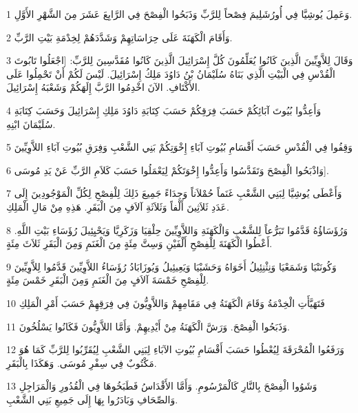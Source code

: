 \par 1 وَعَمِلَ يُوشِيَّا فِي أُورُشَلِيمَ فِصْحاً لِلرَّبِّ وَذَبَحُوا الْفِصْحَ فِي الرَّابِعَ عَشَرَ مِنَ الشَّهْرِ الأَوَّلِ.
\par 2 وَأَقَامَ الْكَهَنَةَ عَلَى حِرَاسَاتِهِمْ وَشَدَّدَهُمْ لِخِدْمَةِ بَيْتِ الرَّبِّ.
\par 3 وَقَالَ لِلاَّوِيِّينَ الَّذِينَ كَانُوا يُعَلِّمُونَ كُلَّ إِسْرَائِيلَ الَّذِينَ كَانُوا مُقَدَّسِينَ لِلرَّبِّ: [اجْعَلُوا تَابُوتَ الْقُدْسِ فِي الْبَيْتِ الَّذِي بَنَاهُ سُلَيْمَانُ بْنُ دَاوُدَ مَلِكُ إِسْرَائِيلَ. لَيْسَ لَكُمْ أَنْ تَحْمِلُوا عَلَى الأَكْتَافِ. الآنَ اخْدِمُوا الرَّبَّ إِلَهَكُمْ وَشَعْبَهُ إِسْرَائِيلَ.
\par 4 وَأَعِدُّوا بُيُوتَ آبَائِكُمْ حَسَبَ فِرَقِكُمْ حَسَبَ كِتَابَةِ دَاوُدَ مَلِكِ إِسْرَائِيلَ وَحَسَبَ كِتَابَةِ سُلَيْمَانَ ابْنِهِ.
\par 5 وَقِفُوا فِي الْقُدْسِ حَسَبَ أَقْسَامِ بُيُوتِ آبَاءِ إِخْوَتِكُمْ بَنِي الشَّعْبِ وَفِرَقِ بُيُوتِ آبَاءِ اللاَّوِيِّينَ
\par 6 وَاذْبَحُوا الْفِصْحَ وَتَقَدَّسُوا وَأَعِدُّوا إِخْوَتَكُمْ لِيَعْمَلُوا حَسَبَ كَلاَمِ الرَّبِّ عَنْ يَدِ مُوسَى].
\par 7 وَأَعْطَى يُوشِيَّا لِبَنِي الشَّعْبِ غَنَماً حُمْلاَناً وَجِدَاءً جَمِيعَ ذَلِكَ لِلْفِصْحِ لِكُلِّ الْمَوْجُودِينَ إِلَى عَدَدِ ثَلاَثِينَ أَلْفاً وَثَلاَثَةِ آلاَفٍ مِنَ الْبَقَرِ. هَذِهِ مِنْ مَالِ الْمَلِكِ.
\par 8 وَرُؤَسَاؤُهُ قَدَّمُوا تَبَرُّعاً لِلشَّعْبِ وَالْكَهَنَةِ وَاللاَّوِيِّينَ حِلْقِيَا وَزَكَرِيَّا وَيَحْيِئِيلَ رُؤَسَاءِ بَيْتِ اللَّهِ. أَعْطُوا الْكَهَنَةَ لِلْفِصْحِ أَلْفَيْنِ وَسِتَّ مِئَةٍ مِنَ الْغَنَمِ وَمِنَ الْبَقَرِ ثَلاَثَ مِئَةٍ.
\par 9 وَكُونَنْيَا وَشَمَعْيَا وَنِثْنِئِيلُ أَخَوَاهُ وَحَشَبْيَا وَيَعِيئِيلُ وَيُوزَابَادُ رُؤَسَاءُ اللاَّوِيِّينَ قَدَّمُوا لِلاَّوِيِّينَ لِلْفِصْحِ خَمْسَةَ آلاَفٍ مِنَ الْغَنَمِ وَمِنَ الْبَقَرِ خَمْسَ مِئَةٍ.
\par 10 فَتَهَيَّأَتِ الْخِدْمَةُ وَقَامَ الْكَهَنَةُ فِي مَقَامِهِمْ وَاللاَّوِيُّونَ فِي فِرَقِهِمْ حَسَبَ أَمْرِ الْمَلِكِ
\par 11 وَذَبَحُوا الْفِصْحَ. وَرَشَّ الْكَهَنَةُ مِنْ أَيْدِيهِمْ. وَأَمَّا اللاَّوِيُّونَ فَكَانُوا يَسْلُخُونَ.
\par 12 وَرَفَعُوا الْمُحْرَقَةَ لِيُعْطُوا حَسَبَ أَقْسَامِ بُيُوتِ الآبَاءِ لِبَنِي الشَّعْبِ لِيُقَرِّبُوا لِلرَّبِّ كَمَا هُوَ مَكْتُوبٌ فِي سِفْرِ مُوسَى. وَهَكَذَا بِالْبَقَرِ.
\par 13 وَشَوُوا الْفِصْحَ بِالنَّارِ كَالْمَرْسُومِ. وَأَمَّا الأَقْدَاسُ فَطَبَخُوهَا فِي الْقُدُورِ وَالْمَرَاجِلِ وَالصِّحَافِ وَبَادَرُوا بِهَا إِلَى جَمِيعِ بَنِي الشَّعْبِ.
